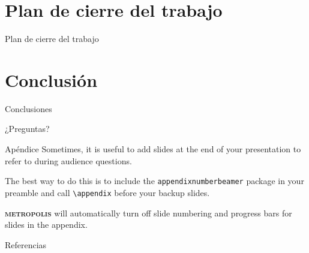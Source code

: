 \documentclass[24pt,aspectratio=169]{beamer}
\newcommand{\themename}{\textbf{\textsc{metropolis}}\xspace}
\begin{document}
\section{Plan de cierre del trabajo}
\begin{frame}{Plan de cierre del trabajo}
\end{frame}

\section{Conclusión}
\begin{frame}{Conclusiones }
\end{frame}

\begin{frame}[standout]
  ¿Preguntas?
\end{frame}

\appendix

\begin{frame}[fragile]{Apéndice}
  Sometimes, it is useful to add slides at the end of your presentation to
  refer to during audience questions.

  The best way to do this is to include the \verb|appendixnumberbeamer|
  package in your preamble and call \verb|\appendix| before your backup slides.

  \themename will automatically turn off slide numbering and progress bars for
  slides in the appendix.
\end{frame}


\begin{frame}[allowframebreaks]{Referencias}
  
  
\end{frame}
\end{document}
